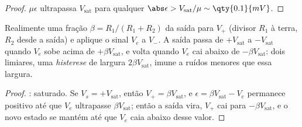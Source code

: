 \begin{proof}
$\mu\epsilon$ ultrapassa $V_{\mathrm{sat}}$ para qualquer $\abs\epsilon >
V_{\mathrm{sat}}/\mu \sim \qty{0.1}{mV}$.
\end{proof}

\begin{proposition}\label{prop:b1:operational-amplifier:schmitt}
Realimente uma fração $\beta = R_1/(R_1 + R_2)$ da saída para $V_+$
(divisor $R_1$ à terra, $R_2$ desde a saída) e aplique o sinal
$V_e$ a $V_-$. A saída passa de $+V_{\mathrm{sat}}$ a
$-V_{\mathrm{sat}}$ quando $V_e$ sobe acima de $+\beta V_{\mathrm{sat}}$, e
volta quando $V_e$ cai abaixo de $-\beta V_{\mathrm{sat}}$: dois limiares,
uma \emph{histerese} de largura $2\beta V_{\mathrm{sat}}$, imune a ruídos
menores que essa largura.
\end{proposition}

\begin{proof}
: saturado. Se $V_s = +V_{\mathrm{sat}}$, então $V_+ =
\beta V_{\mathrm{sat}}$, e $\epsilon = \beta V_{\mathrm{sat}} - V_e$
permanece positivo até que $V_e$ ultrapasse $\beta V_{\mathrm{sat}}$; então a
saída vira, $V_+$ cai para $-\beta V_{\mathrm{sat}}$, e o novo estado
se mantém até que $V_e$ caia abaixo desse valor.
\end{proof}

